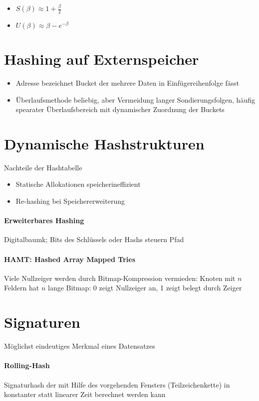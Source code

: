 \begin{itemize}
  \item $S(\beta) \approx 1 + \frac{\beta}{2}$
  \item $U(\beta) \approx \beta - e^{-\beta}$
\end{itemize}

\section{Hashing auf Externspeicher}

\begin{itemize}
  \item Adresse bezeichnet Bucket der mehrere Daten in Einfügereihenfolge fässt
  \item Überlaufsmethode beliebig, aber Vermeidung langer Sondierungsfolgen, häufig spearater Überlaufsbereich mit dynamischer Zuordnung der Buckets
\end{itemize}

\section{Dynamische Hashstrukturen}

Nachteile der Hashtabelle

\begin{itemize}
  \item Statische Allokationen speicherineffizient
  \item Re-hashing bei Speichererweiterung
\end{itemize}

\paragraph{Erweiterbares Hashing} Digitalbaumk; Bits des Schlüssels oder Hashs steuern Pfad

\paragraph{HAMT: Hashed Array Mapped Tries}
Viele Nullzeiger werden durch Bitmap-Kompression vermieden: Knoten mit $n$ Feldern hat $n$ lange Bitmap: 0 zeigt Nullzeiger an, 1 zeigt belegt durch Zeiger

\section{Signaturen}

Möglichst eindeutiges Merkmal eines Datensatzes

\paragraph{Rolling-Hash}
Signaturhash der mit Hilfe des vorgehenden Fensters (Teilzeichenkette) in konstanter statt linearer Zeit berechnet werden kann